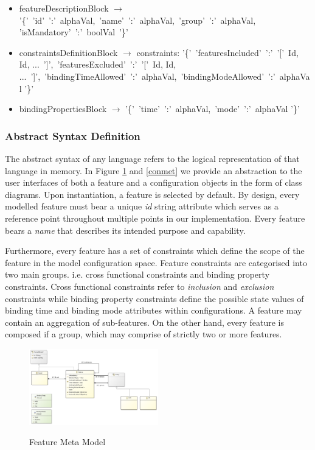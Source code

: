 \documentclass[conference]{IEEEtran}
\begin{document}
\begin{itemize}
	\item[] featureDescriptionBlock $\longrightarrow$ '\{'\ 'id'\ ':'\ alphaVal,\ 'name'\ ':'\ alphaVal,\ 'group'\ ':'\ alphaVal, 'isMandatory'\ ':'\ boolVal\ '\}' \\
	
	\item[] constraintsDefinitionBlock $\longrightarrow$ constraints: '\{'\ 'featuresIncluded'\ ':'\ '['\ Id, Id, ...\ ']',\ 'featuresExcluded'\ ':'\ '['\ Id, Id, ...\ ']',\ 'bindingTimeAllowed'\ ':'\ alphaVal,\ 'bindingModeAllowed'\ ':'\ alphaVal '\}'\\
	
	\item[] bindingPropertiesBlock $\longrightarrow$ '\{'\ 'time'\ ':'\ alphaVal,\ 'mode'\ ':'\ alphaVal '\}'\\
\end{itemize}

\subsubsection{Abstract Syntax Definition}
The abstract syntax of any language refers to the logical representation of that language in memory. In Figure \ref{femet} and \ref{conmet} we provide an abstraction to the user interfaces of both a feature and a configuration objects in the form of class diagrams. Upon instantiation, a feature is selected by default. By design, every modelled feature must bear a unique \textit{id} string attribute which serves as a reference point throughout multiple points in our implementation. Every feature bears a \textit{name} that describes its intended purpose and capability.

Furthermore, every feature has a set of constraints which define the scope of the feature in the model configuration space. Feature constraints are categorised into two main groups. i.e. cross functional constraints and binding property constraints.  Cross functional constraints refer to \textit{inclusion} and \textit{exclusion} constraints while binding property constraints define the possible state values of binding time and binding mode attributes within configurations. A feature may contain an aggregation of sub-features. On the other hand, every feature is composed if a group, which may comprise of strictly two or more features.

\begin{figure}[H]
\caption{Feature Meta Model}
\centering
\includegraphics[width=0.5\textwidth]{diagrams/feature.png}
\label{femet}
\end{figure}
\end{document}
